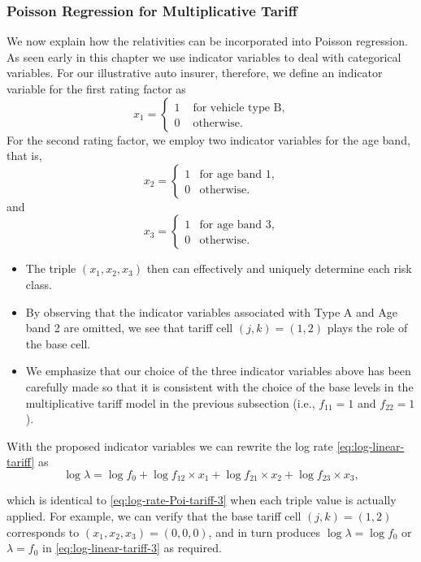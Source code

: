 \documentclass[ignorenonframetext,]{beamer}
\begin{document}
\begin{frame}[allowframebreaks]
\frametitle{Poisson Regression for Multiplicative Tariff}

We now explain how the relativities can be incorporated into Poisson regression. As seen early in this chapter we use indicator variables to deal with categorical variables. For our illustrative auto insurer, therefore, we define an indicator variable for the first rating factor as
$$
x_1=
\begin{cases}
      1 & \text{ for vehicle type B}, \\
      0 & \text{ otherwise}.
\end{cases}
$$
For the second rating factor, we employ two indicator variables for the age band, that is,
$$
x_2=
\begin{cases}
     1 & \text{for age band 1}, \\
     0 & \text{otherwise}.
\end{cases}
$$
and 
$$
x_3=
\begin{cases}
     1 & \text{for age band 3}, \\
     0 & \text{otherwise}.
\end{cases}
$$

\begin{itemize}
\item The triple $(x_1, x_2, x_3)$ then can effectively and uniquely determine each risk class.
\item By observing that the indicator variables associated with Type A and Age band 2 are omitted, we see that tariff cell $(j,k)=(1,2)$ plays the role of the base cell. 
\item We emphasize that our choice of the three indicator variables above has been carefully made so that it is consistent with the choice of the base levels in the multiplicative tariff model in the previous subsection (i.e., $f_{11}=1$ and $f_{22}=1$).  
\end{itemize}

\framebreak

With the proposed indicator variables we can rewrite the log rate \eqref{eq:log-linear-tariff} as
\begin{equation}
\log \lambda= \log f_0+ \log f_{12}  \times x_1 + \log f_{21} \times x_2 +\log f_{23} \times x_3,
\label{eq:log-linear-tariff-3}
\end{equation}

which is identical to \eqref{eq:log-rate-Poi-tariff-3} when each triple value is actually applied. For example, we can verify that the base tariff cell $(j,k)=(1,2)$ corresponds to $(x_1, x_2,x_3)=(0, 0, 0)$, and in turn produces $\log \lambda=\log f_0$ or $\lambda= f_0$ in \eqref{eq:log-linear-tariff-3} as required. 



\end{frame}
\end{document}
